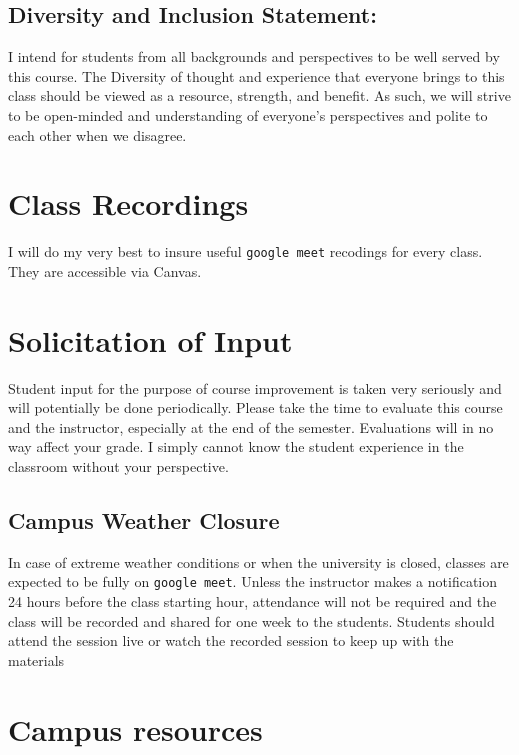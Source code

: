 \documentclass[11pt,]{article}
\begin{document}
\subsection{Diversity and Inclusion
Statement:}\label{diversity-and-inclusion-statement}

I intend for students from all backgrounds and perspectives to be well
served by this course. The Diversity of thought and experience that
everyone brings to this class should be viewed as a resource, strength,
and benefit. As such, we will strive to be open-minded and understanding
of everyone's perspectives and polite to each other when we disagree.

\section{Class Recordings}\label{class-recordings}

I will do my very best to insure useful \texttt{google\ meet} recodings
for every class. They are accessible via Canvas.

\section{Solicitation of Input}\label{solicitation-of-input}

Student input for the purpose of course improvement is taken very
seriously and will potentially be done periodically. Please take the
time to evaluate this course and the instructor, especially at the end
of the semester. Evaluations will in no way affect your grade. I simply
cannot know the student experience in the classroom without your
perspective.

\subsection{Campus Weather Closure}\label{campus-weather-closure}

In case of extreme weather conditions or when the university is closed,
classes are expected to be fully on \texttt{google\ meet}. Unless the
instructor makes a notification 24 hours before the class starting hour,
attendance will not be required and the class will be recorded and
shared for one week to the students. Students should attend the session
live or watch the recorded session to keep up with the materials

\section{Campus resources}\label{campus-resources}
\end{document}
